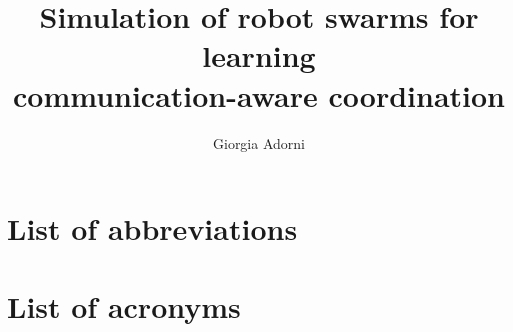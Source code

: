 \documentclass[mscthesis, 11pt,oneside]{usiinfthesis}
\title{Simulation of robot swarms for learning\\ communication-aware coordination} %
\author{Giorgia Adorni} %
\begin{document}
\maketitle %

\frontmatter %

\begin{abstract}
\begingroup
\let\clearpage\relax

\endgroup
\end{abstract}


\begin{acknowledgements}
\begingroup
\let\clearpage\relax

\endgroup
\end{acknowledgements}

\tableofcontents 
\listoffigures %
\listoftables %


\mainmatter









\appendix%



\chapter{List of abbreviations}
\label{chp:abbreviations}
\let\clearpage\relax
\vspace*{-90pt}
\printglossary[title= ]

\newpage
\let\cleardoublepage\clearpage

\chapter{List of acronyms}
\label{chp:acronyms}
\glsaddall  %
\vspace*{-120pt}
\printglossary[type=acronym]

\backmatter

%
%
\nocite{*}



\end{document}
